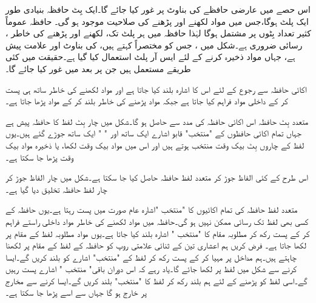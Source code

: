 اس حصے  میں عارضی حافظے  کی بناوٹ پر غور کیا جائے گا۔ایک بِٹ حافظہ بنیادی طور    ایک پلٹ ہوگا،جس میں مواد لکھنے اور پڑھنے کی صلاحیت موجود ہو گی۔ حافظہ عموماً کثیر تعداد بِٹوں پر مشتمل ہوگا لہٰذا حافظہ میں ہر پلٹ  تک، لکھنے اور پڑھنے کی خاطر ،  رسائی ضروری ہے۔شکل میں ، جس کو مختصراً کہتے ہیں، کی بناوٹ اور علامت  پیش ہے، جہاں مواد ذخیرہ کرنے کے لئے ایس آر  پلٹ استعمال کیا گیا ہے۔حقیقت میں کئی طریقے مستعمل ہیں جن  پر  بعد میں غور کیا جائے گا۔ 


 اکائی حافظہ سے رجوع کے لئے    اس کا   اشارہ بلند کیا جاتا ہے اور      مواد لکھنے کی خاطر  ساتھ ہی  پست کر کے  داخلی مواد فراہم کیا جاتا ہے جبکہ  مواد پڑھنے کی خاطر    بلند کر کے مواد پڑھا جاتا ہے۔

متعدد  بِٹ حافظہ اس  اکائی حافظہ کی مدد سے حاصل  ہو گا۔شکل  میں چار بِٹ  لفظ  کا حافظہ  پیش ہے جہاں تمام اکائی حافظوں کے   "منتخب" قابو اشارے ایک ساتھ  اور  "  " ایک ساتھ جوڑے گئے ہیں۔یوں  لفظ کے چاروں بِٹ بیک وقت منتخب ہوتے ہیں اور اس میں مواد   بیک وقت لکھا،  یا  ذخیرہ مواد بیک وقت پڑھا جا سکتا ہے۔

اس طرح کے کئی الفاظ جوڑ کر  متعدد  لفظ حافظہ حاصل  کیا جا سکتا ہے۔شکل  میں چار الفاظ جوڑ کر چار لفظ  حافظہ  تخلیق دیا گیا ہے۔

متعدد لفظ حافظہ  کی تمام  اکائیوں   کا "منتخب "اشارہ عام صورت میں  پست رہتا ہے۔یوں حافظہ کے  کسی بھی لفظ  تک رسائی  ممکن  نہیں ہو گی۔حافظہ میں مواد لکھنے کی خاطر مواد   داخلی راستے فراہم کر کے   پست رکھ کر  مطلوبہ مقام کا  "منتخب " اشارہ بلند کیا جاتا ہے۔یوں مواد مطلوبہ لفظ کے مقام پر لکھا جاتا ہے۔ فرض کریں ہم  اعشاری تین   کے  ثنائی علامتی روپ    کو حافظہ کے لفظ  کے مقام پر لکھنا چاہتے ہیں۔ہم مداخل پر  مہیا کر کے     پست   رکھ کر لفظ   کے  "منتخب" اشارے کو بلند   کریں گے۔ایسا کرنے سے شکل   میں لفظ   پر   لکھا  جائے گا۔یاد رہے کہ اس دوران باقی" منتخب " اشارے پست رہیں گے۔اسی لفظ کو پڑھنے کے لئے  ہم     بلند رکھ کر لفظ   کا  "منتخب"  بلند کریں گے۔ایسا کرنے سے مخارج   پر   خارج ہو گا  جہاں سے اسے  پڑھا جا سکتا ہے۔


